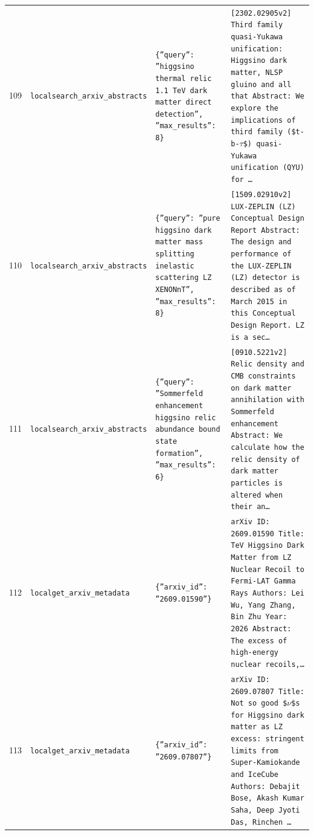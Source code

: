 \documentclass[11pt,a4paper]{article}
\begin{document}
\begin{longtable}{@{}p{}p{}p{}p{}@{}}
109 & \texttt{local}\newline\texttt{search\_\allowbreak{}arxiv\_\allowbreak{}abstracts} & \texttt{\{''query'':\allowbreak{} ''higgsino thermal relic 1.1 TeV dark matter direct detection'',\allowbreak{} ''max\_\allowbreak{}results'':\allowbreak{} 8\}\allowbreak{}} & \texttt{[2302.02905v2]\allowbreak{} Third family quasi-Yukawa unification:\allowbreak{} Higgsino dark matter,\allowbreak{} NLSP gluino and all that Abstract:\allowbreak{} We explore the implications of third family (\$t-b-$\tau$\$)\allowbreak{} quasi-Yukawa unification (QYU)\allowbreak{} for \ldots{}\allowbreak{}} \\
110 & \texttt{local}\newline\texttt{search\_\allowbreak{}arxiv\_\allowbreak{}abstracts} & \texttt{\{''query'':\allowbreak{} ''pure higgsino dark matter mass splitting inelastic scattering LZ XENONnT'',\allowbreak{} ''max\_\allowbreak{}results'':\allowbreak{} 8\}\allowbreak{}} & \texttt{[1509.02910v2]\allowbreak{} LUX-ZEPLIN (LZ)\allowbreak{} Conceptual Design Report Abstract:\allowbreak{} The design and performance of the LUX-ZEPLIN (LZ)\allowbreak{} detector is described as of March 2015 in this Conceptual Design Report. LZ is a sec\ldots{}\allowbreak{}} \\
111 & \texttt{local}\newline\texttt{search\_\allowbreak{}arxiv\_\allowbreak{}abstracts} & \texttt{\{''query'':\allowbreak{} ''Sommerfeld enhancement higgsino relic abundance bound state formation'',\allowbreak{} ''max\_\allowbreak{}results'':\allowbreak{} 6\}\allowbreak{}} & \texttt{[0910.5221v2]\allowbreak{} Relic density and CMB constraints on dark matter annihilation with Sommerfeld enhancement Abstract:\allowbreak{}   We calculate how the relic density of dark matter particles is altered when their an\ldots{}\allowbreak{}} \\
112 & \texttt{local}\newline\texttt{get\_\allowbreak{}arxiv\_\allowbreak{}metadata} & \texttt{\{''arxiv\_\allowbreak{}id'':\allowbreak{} ''2609.01590''\}\allowbreak{}} & \texttt{arXiv ID:\allowbreak{} 2609.01590 Title:\allowbreak{} TeV Higgsino Dark Matter from LZ Nuclear Recoil to Fermi-LAT Gamma Rays Authors:\allowbreak{} Lei Wu,\allowbreak{} Yang Zhang,\allowbreak{} Bin Zhu Year:\allowbreak{} 2026 Abstract:\allowbreak{} The excess of high-energy nuclear recoils,\allowbreak{}\ldots{}\allowbreak{}} \\
113 & \texttt{local}\newline\texttt{get\_\allowbreak{}arxiv\_\allowbreak{}metadata} & \texttt{\{''arxiv\_\allowbreak{}id'':\allowbreak{} ''2609.07807''\}\allowbreak{}} & \texttt{arXiv ID:\allowbreak{} 2609.07807 Title:\allowbreak{} Not so good \$$\nu$\$s for Higgsino dark matter as LZ excess:\allowbreak{} stringent limits from Super-Kamiokande and IceCube Authors:\allowbreak{} Debajit Bose,\allowbreak{} Akash Kumar Saha,\allowbreak{} Deep Jyoti Das,\allowbreak{} Rinchen \ldots{}\allowbreak{}} \\

\end{longtable}
\end{document}
